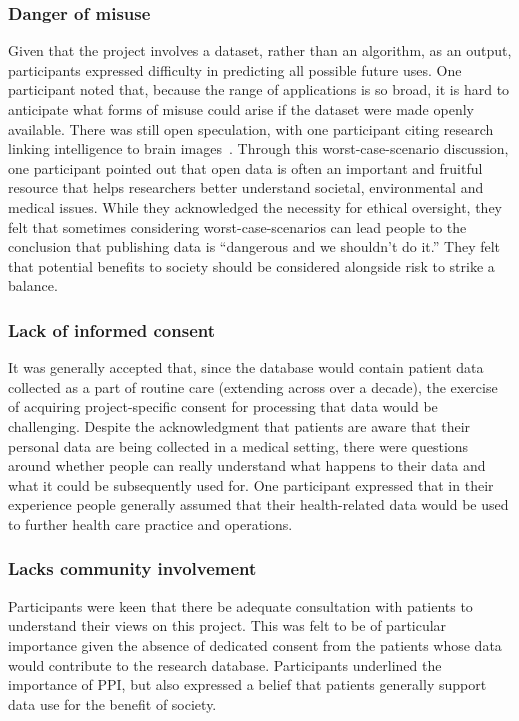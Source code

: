 \documentclass{article}
\begin{document}
  
\subsubsection{Danger of misuse}

Given that the project involves a dataset, rather than an algorithm,
as an output, participants expressed difficulty in
predicting all possible future uses. One participant noted that,
because the range of applications is so broad, it is hard to
anticipate what forms of misuse could arise if the dataset were made
openly available. There was still open speculation, with one
participant citing research linking intelligence to brain
images~\cite{dubois}. Through this worst-case-scenario discussion,
one participant pointed out that open data is often an important and
fruitful resource that helps researchers better understand societal,
environmental and medical issues. While they acknowledged the
necessity for ethical oversight, they felt that sometimes considering
worst-case-scenarios can lead people to the conclusion that publishing data
is ``dangerous and we shouldn't do it.'' They felt that potential
benefits to society should be considered alongside risk to strike a
balance. 

\subsubsection{Lack of informed consent}

It was generally accepted that, since the database would contain
patient data collected as a part of routine care (extending across
over a decade), the exercise of
acquiring project-specific consent for processing that data would be
challenging. Despite the acknowledgment that patients are aware that
their personal data are being collected in a medical setting, there
were questions around whether people can really understand what
happens to their data and what it could be subsequently used for.
One participant expressed that in their experience people generally
assumed that their health-related data would be used to further
health care practice and operations.


\subsubsection{Lacks community involvement}

Participants were keen that there be adequate consultation with
patients to understand their views on this project. This was felt to
be of particular importance given the absence of dedicated consent
from the patients whose data would contribute to the research
database. Participants underlined the importance of PPI, but also
expressed a belief that patients generally support data use for the
benefit of society.
\end{document}
